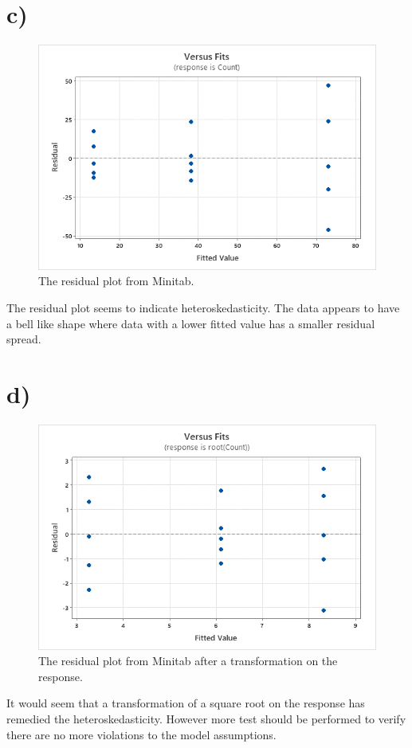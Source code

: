 \documentclass{article}
\begin{document}
\section*{c)}
\begin{figure}[h]
    \centering
    \includegraphics[width=1\textwidth]{./images/c.png}
    \caption{The residual plot from Minitab.}
    \label{fig:c}
  \end{figure}
The residual plot seems to indicate heteroskedasticity.
The data appears to have a bell like shape where data with a lower fitted value has a
smaller residual spread.
\clearpage
\section*{d)}
\begin{figure}[h]
    \centering
    \includegraphics[width=1\textwidth]{./images/d.png}
    \caption{The residual plot from Minitab after a transformation on the response.}
    \label{fig:d}
  \end{figure}
It would seem that a transformation of a square root on the response has remedied the heteroskedasticity.
However more test should be performed to verify there are no more violations to the model assumptions. 
\end{document}
